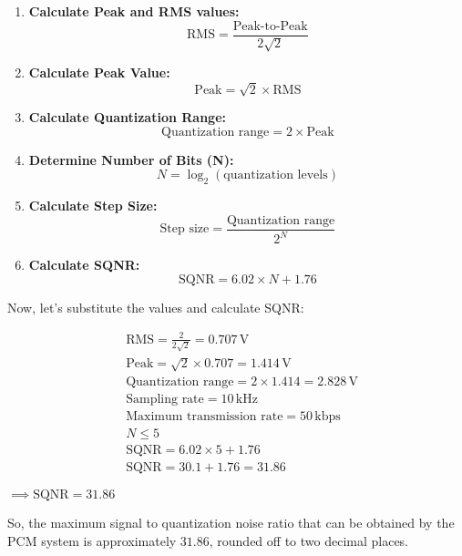 \documentclass[a4,12pt,onecolumn]{IEEEtran}
\begin{document}
\begin{enumerate}
    \item \textbf{Calculate Peak and RMS values:}
    \begin{equation}\label{eq:peak_rms}
        \text{RMS} = \frac{\text{Peak-to-Peak}}{2\sqrt{2}}
    \end{equation}

    \item \textbf{Calculate Peak Value:}
    \begin{equation}\label{eq:peak}
        \text{Peak} = \sqrt{2} \times \text{RMS}
    \end{equation}

    \item \textbf{Calculate Quantization Range:}
    \begin{equation}\label{eq:quant_range}
        \text{Quantization range} = 2 \times \text{Peak}
    \end{equation}

    \item \textbf{Determine Number of Bits (N):}
    \begin{equation}\label{eq:num_bits}
        N = \log_2(\text{quantization levels})
    \end{equation}

    \item \textbf{Calculate Step Size:}
    \begin{equation}\label{eq:step_size}
        \text{Step size} = \frac{\text{Quantization range}}{2^N}
    \end{equation}

    \item \textbf{Calculate SQNR:}
    \begin{equation}\label{eq:sqnr}
        \text{SQNR} = 6.02 \times N + 1.76
         \end{equation}
\end{enumerate}

Now, let's substitute the values and calculate SQNR:

\begin{align*}
    &\text{RMS} = \frac{2}{2\sqrt{2}} = 0.707 \, \text{V} \\
    &\text{Peak} = \sqrt{2} \times 0.707 = 1.414 \, \text{V} \\
    &\text{Quantization range} = 2 \times 1.414 = 2.828 \, \text{V} \\
    &\text{Sampling rate} = 10 \, \text{kHz} \\
    &\text{Maximum transmission rate} = 50 \, \text{kbps} \\
    &N \leq 5 \\
    &\text{SQNR} = 6.02 \times 5 + 1.76 \\
    &\text{SQNR} = 30.1 + 1.76 = 31.86
\end{align*}

$\implies \text{SQNR} = 31.86$

 So, the maximum signal to quantization noise ratio that can be obtained by the PCM system is approximately \(31.86\), rounded off to two decimal places.
\end{document}
